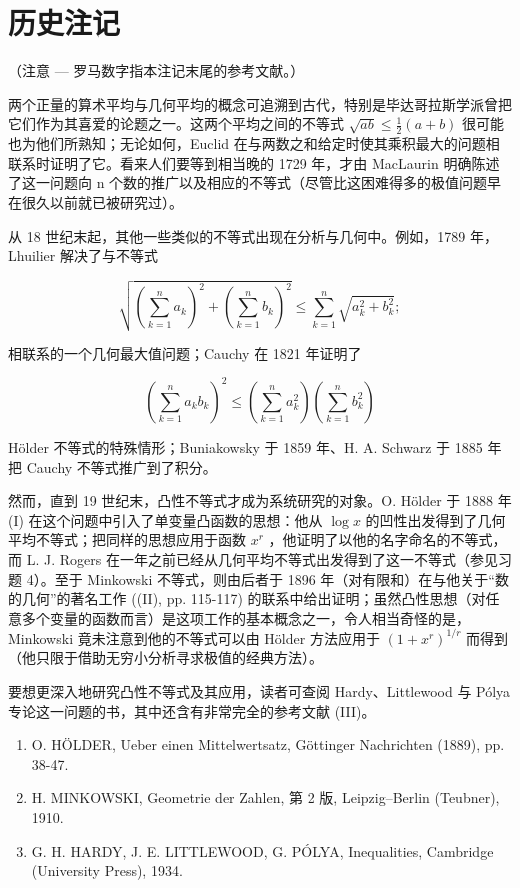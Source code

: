\chapter*{历史注记}
{}

（注意 --- 罗马数字指本注记末尾的参考文献。）

两个正量的算术平均与几何平均的概念可追溯到古代，特别是毕达哥拉斯学派曾把它们作为其喜爱的论题之一。这两个平均之间的不等式 \(\sqrt{ab} \leqslant \frac{1}{2}(a + b)\) 很可能也为他们所熟知；无论如何，Euclid 在与两数之和给定时使其乘积最大的问题相联系时证明了它。看来人们要等到相当晚的 1729 年，才由 MacLaurin 明确陈述了这一问题向 n 个数的推广以及相应的不等式（尽管比这困难得多的极值问题早在很久以前就已被研究过）。

从 18 世纪末起，其他一些类似的不等式出现在分析与几何中。例如，1789 年，Lhuilier 解决了与不等式

\[
\sqrt {\left(\sum_ {k = 1} ^ {n} a _ {k}\right) ^ {2} + \left(\sum_ {k = 1} ^ {n} b _ {k}\right) ^ {2}} \leqslant \sum_ {k = 1} ^ {n} \sqrt {a _ {k} ^ {2} + b _ {k} ^ {2}};
\]

相联系的一个几何最大值问题；Cauchy 在 1821 年证明了

\[
\left(\sum_ {k = 1} ^ {n} a _ {k} b _ {k}\right) ^ {2} \leqslant \left(\sum_ {k = 1} ^ {n} a _ {k} ^ {2}\right) \left(\sum_ {k = 1} ^ {n} b _ {k} ^ {2}\right)
\]

Hölder 不等式的特殊情形；Buniakowsky 于 1859 年、H. A. Schwarz 于 1885 年把 Cauchy 不等式推广到了积分。

然而，直到 19 世纪末，凸性不等式才成为系统研究的对象。O. Hölder 于 1888 年 (I) 在这个问题中引入了单变量凸函数的思想：他从 \(\log x\) 的凹性出发得到了几何平均不等式；把同样的思想应用于函数 \(x^{r}\) ，他证明了以他的名字命名的不等式，而 L. J. Rogers 在一年之前已经从几何平均不等式出发得到了这一不等式（参见习题 4）。至于 Minkowski 不等式，则由后者于 1896 年（对有限和）在与他关于“数的几何”的著名工作 ((II), pp. 115-117) 的联系中给出证明；虽然凸性思想（对任意多个变量的函数而言）是这项工作的基本概念之一，令人相当奇怪的是，Minkowski 竟未注意到他的不等式可以由 Hölder 方法应用于 \((1 + x^{r})^{1 / r}\) 而得到（他只限于借助无穷小分析寻求极值的经典方法）。

要想更深入地研究凸性不等式及其应用，读者可查阅 Hardy、Littlewood 与 Pólya 专论这一问题的书，其中还含有非常完全的参考文献 (III)。

\begin{enumerate}
\def\labelenumi{(\Roman{enumi})}
\item
  O. HÖLDER, Ueber einen Mittelwertsatz, Göttinger Nachrichten (1889), pp. 38-47.
\item
  H. MINKOWSKI, Geometrie der Zahlen, 第 2 版, Leipzig--Berlin (Teubner), 1910.
\item
  G. H. HARDY, J. E. LITTLEWOOD, G. PÓLYA, Inequalities, Cambridge (University Press), 1934.
\end{enumerate}

